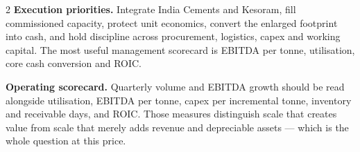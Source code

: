 \vspace{4mm}

\noindent
{}\hfill
{}\hfill
{}\hfill
{}\hfill
{}\hfill
{}\hfill
{}\hfill
{}

\vspace{5mm}
\begin{paracol}{2}
\textbf{Execution priorities.} Integrate India Cements and Kesoram, fill commissioned
capacity, protect unit economics, convert the enlarged footprint into cash, and hold
discipline across procurement, logistics, capex and working capital. The most useful
management scorecard is EBITDA per tonne, utilisation, core cash conversion and ROIC.

\switchcolumn
\textbf{Operating scorecard.} Quarterly volume and EBITDA growth should be read
alongside utilisation, EBITDA per tonne, capex per incremental tonne, inventory and
receivable days, and ROIC. Those measures distinguish scale that creates value from
scale that merely adds revenue and depreciable assets — which is the whole question
at this price.
\end{paracol}
\clearpage

